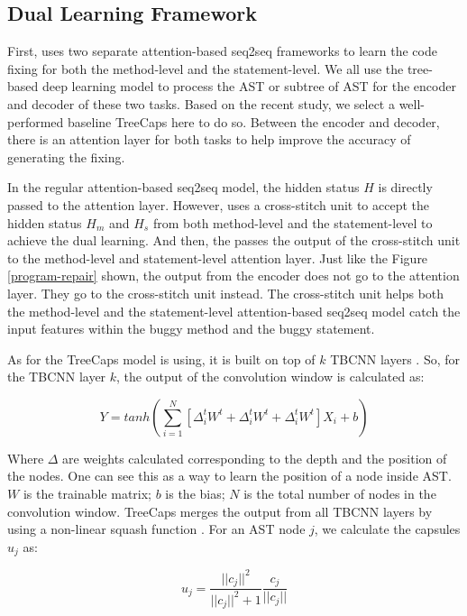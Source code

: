\subsection{Dual Learning Framework}

First, \tool uses two separate attention-based seq2seq frameworks to learn the code fixing for both the method-level and the statement-level. We all use the tree-based deep learning model to process the AST or subtree of AST for the encoder and decoder of these two tasks. Based on the recent study, we select a well-performed baseline TreeCaps \cite{bui2021treecaps} here to do so. Between the encoder and decoder, there is an attention layer for both tasks to help improve the accuracy of generating the fixing.

In the regular attention-based seq2seq model, the hidden status $H$ is directly passed to the attention layer. However, \tool uses a cross-stitch unit to accept the hidden status $H_m$ and $H_s$ from both method-level and the statement-level to achieve the dual learning. And then, the \tool passes the output of the cross-stitch unit to the method-level and statement-level attention layer. Just like the Figure \ref{program-repair} shown, the output from the encoder does not go to the attention layer. They go to the cross-stitch unit instead. The cross-stitch unit helps both the method-level and the statement-level attention-based seq2seq model catch the input features within the buggy method and the buggy statement.

As for the TreeCaps model \tool is using, it is built on top of $k$ TBCNN layers \cite{mou2014tbcnn}. So, for the TBCNN layer $k$, the output of the convolution window is calculated as:

\begin{equation}\label{eq:1}
	Y = tanh(\sum_{i=1}^{N}[\Delta^t_iW^t + \Delta^t_iW^t + \Delta^t_iW^t]X_i + b)
\end{equation}

Where $\Delta$ are weights calculated corresponding to the depth and the position of the nodes. One can see this as a
way to learn the position of a node inside AST. $W$ is the trainable matrix; $b$ is the bias; $N$ is the total number of nodes in the convolution window. TreeCaps merges the output from all TBCNN layers by using a non-linear squash
function \cite{sabour2017dynamic}. For an AST node $j$, we calculate the capsules $u_j$ as:

\begin{equation}\label{eq:2}
	u_j = \frac{||c_j||^2}{||c_j||^2+1}\frac{c_j}{||c_j||}
\end{equation}


